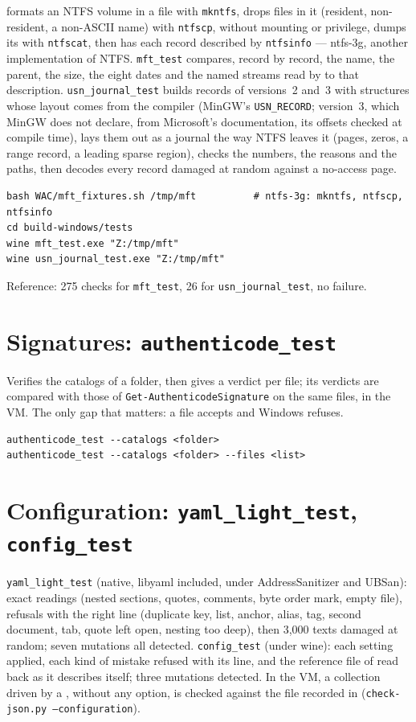 \documentclass[11pt,a4paper,oneside]{report}
\begin{document}
 formats an NTFS volume in a file with
\texttt{mkntfs}, drops files in it (resident, non-resident, a non-ASCII name)
with \texttt{ntfscp}, without mounting or privilege, dumps its
 with \texttt{ntfscat}, then has each record described by
\texttt{ntfsinfo} — ntfs-3g, another implementation of NTFS.
\texttt{mft\_test} compares, record by record, the name, the parent, the
size, the eight dates and the named streams read by \wac{} to that
description. \texttt{usn\_journal\_test} builds records of versions~2 and~3
with structures whose layout comes from the compiler (MinGW's
\texttt{USN\_RECORD}; version~3, which MinGW does not declare, from
Microsoft's documentation, its offsets checked at compile time), lays them out
as a journal the way NTFS leaves it (pages, zeros, a range record, a leading
sparse region), checks the numbers, the reasons and the paths, then decodes
every record damaged at random against a no-access page.

\begin{lstlisting}
bash WAC/mft_fixtures.sh /tmp/mft          # ntfs-3g: mkntfs, ntfscp, ntfsinfo
cd build-windows/tests
wine mft_test.exe "Z:/tmp/mft"
wine usn_journal_test.exe "Z:/tmp/mft"
\end{lstlisting}

Reference: 275 checks for \texttt{mft\_test}, 26 for
\texttt{usn\_journal\_test}, no failure.

\section{Signatures: \texttt{authenticode\_test}}

Verifies the catalogs of a folder, then gives a verdict per file; its verdicts
are compared with those of \texttt{Get-AuthenticodeSignature} on the same files,
in the VM. The only gap that matters: a file \wac{} accepts and Windows refuses.

\begin{lstlisting}
authenticode_test --catalogs <folder>
authenticode_test --catalogs <folder> --files <list>
\end{lstlisting}

\section{Configuration: \texttt{yaml\_light\_test}, \texttt{config\_test}}

\texttt{yaml\_light\_test} (native, libyaml included, under AddressSanitizer
and UBSan): exact readings (nested sections, quotes, comments, byte order
mark, empty file), refusals with the right line (duplicate key, list, anchor,
alias, tag, second document, tab, quote left open, nesting too deep), then
3,000 texts damaged at random; seven mutations all detected.
\texttt{config\_test} (under wine): each setting applied, each kind of mistake
refused with its line, and the reference file of  read back
as it describes itself; three mutations detected. In the VM, a collection
driven by a , without any option, is checked against the file
recorded in  (\texttt{check-json.py
--configuration}).
\end{document}
